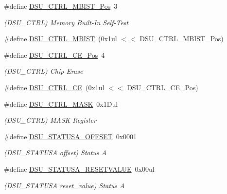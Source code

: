 \begin{DoxyCompactItemize}
\item 
\#define \mbox{\hyperlink{group___s_a_m_d21___d_s_u_gae2f8bb8c8fde9739e8e15e76b5a052fc}{D\+S\+U\+\_\+\+C\+T\+R\+L\+\_\+\+M\+B\+I\+S\+T\+\_\+\+Pos}}~3
\begin{DoxyCompactList}\small\item\em (D\+S\+U\+\_\+\+C\+T\+RL) Memory Built-\/\+In Self-\/\+Test \end{DoxyCompactList}\item 
\#define \mbox{\hyperlink{group___s_a_m_d21___d_s_u_ga29a4889c6f02e7f58d390da5cb809eab}{D\+S\+U\+\_\+\+C\+T\+R\+L\+\_\+\+M\+B\+I\+ST}}~(0x1ul $<$$<$ D\+S\+U\+\_\+\+C\+T\+R\+L\+\_\+\+M\+B\+I\+S\+T\+\_\+\+Pos)
\item 
\#define \mbox{\hyperlink{group___s_a_m_d21___d_s_u_gaef5ca1fd2f78e579bae1661fb54ccae7}{D\+S\+U\+\_\+\+C\+T\+R\+L\+\_\+\+C\+E\+\_\+\+Pos}}~4
\begin{DoxyCompactList}\small\item\em (D\+S\+U\+\_\+\+C\+T\+RL) Chip Erase \end{DoxyCompactList}\item 
\#define \mbox{\hyperlink{group___s_a_m_d21___d_s_u_ga5e11b643b12c8d48be1e324bc42008b6}{D\+S\+U\+\_\+\+C\+T\+R\+L\+\_\+\+CE}}~(0x1ul $<$$<$ D\+S\+U\+\_\+\+C\+T\+R\+L\+\_\+\+C\+E\+\_\+\+Pos)
\item 
\#define \mbox{\hyperlink{group___s_a_m_d21___d_s_u_gad7cc167d8a8791942e3149bd93278134}{D\+S\+U\+\_\+\+C\+T\+R\+L\+\_\+\+M\+A\+SK}}~0x1\+Dul
\begin{DoxyCompactList}\small\item\em (D\+S\+U\+\_\+\+C\+T\+RL) M\+A\+SK Register \end{DoxyCompactList}\item 
\#define \mbox{\hyperlink{group___s_a_m_d21___d_s_u_ga5bbcb19f47173c3bdee8ce58b612eac0}{D\+S\+U\+\_\+\+S\+T\+A\+T\+U\+S\+A\+\_\+\+O\+F\+F\+S\+ET}}~0x0001
\begin{DoxyCompactList}\small\item\em (D\+S\+U\+\_\+\+S\+T\+A\+T\+U\+SA offset) Status A \end{DoxyCompactList}\item 
\#define \mbox{\hyperlink{group___s_a_m_d21___d_s_u_ga39ce3f6cadacf2ea11a0e8ab5d6bcd4b}{D\+S\+U\+\_\+\+S\+T\+A\+T\+U\+S\+A\+\_\+\+R\+E\+S\+E\+T\+V\+A\+L\+UE}}~0x00ul
\begin{DoxyCompactList}\small\item\em (D\+S\+U\+\_\+\+S\+T\+A\+T\+U\+SA reset\+\_\+value) Status A \end{DoxyCompactList}\item 

\end{DoxyCompactItemize}
